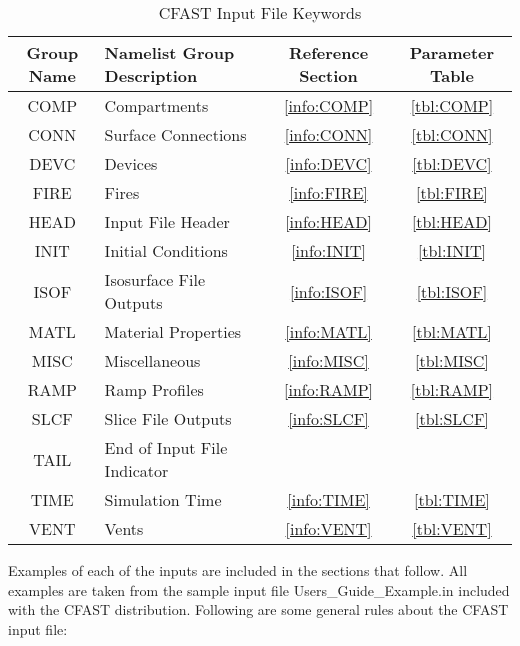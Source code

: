 \begin{table}[ht]
\begin{center}
\caption{CFAST Input File Keywords}
\label{tbl:namelistgroups}
\begin{tabular}{|c|l|c|c|}
\hline
Group Name   & Namelist Group Description     & Reference Section & Parameter Table  \\ \hline
{\ct COMP}   & Compartments                   & \ref{info:COMP}   & \ref{tbl:COMP}   \\ \hline
{\ct CONN}   & Surface Connections            & \ref{info:CONN}   & \ref{tbl:CONN}   \\ \hline
{\ct DEVC}   & Devices                        & \ref{info:DEVC}   & \ref{tbl:DEVC}   \\ \hline
{\ct FIRE}   & Fires                          & \ref{info:FIRE}   & \ref{tbl:FIRE}   \\ \hline
{\ct HEAD}   & Input File Header              & \ref{info:HEAD}   & \ref{tbl:HEAD}   \\ \hline
{\ct INIT}   & Initial Conditions             & \ref{info:INIT}   & \ref{tbl:INIT}   \\ \hline
{\ct ISOF}   & Isosurface File Outputs        & \ref{info:ISOF}   & \ref{tbl:ISOF}   \\ \hline
{\ct MATL}   & Material Properties            & \ref{info:MATL}   & \ref{tbl:MATL}   \\ \hline
{\ct MISC}   & Miscellaneous                  & \ref{info:MISC}   & \ref{tbl:MISC}   \\ \hline
{\ct RAMP}   & Ramp Profiles                  & \ref{info:RAMP}   & \ref{tbl:RAMP}   \\ \hline
{\ct SLCF}   & Slice File Outputs             & \ref{info:SLCF}   & \ref{tbl:SLCF}   \\ \hline
{\ct TAIL}   & End of Input File Indicator    &                   &                  \\ \hline
{\ct TIME}   & Simulation Time                & \ref{info:TIME}   & \ref{tbl:TIME}   \\ \hline
{\ct VENT}   & Vents                          & \ref{info:VENT}   & \ref{tbl:VENT}   \\ \hline
\end{tabular}
\end{center}
\end{table}

Examples of each of the inputs are included in the sections that follow.  All examples are taken from the sample input file {\ct Users\_Guide\_Example.in} included with the CFAST distribution. Following are some general rules about the CFAST input file:

